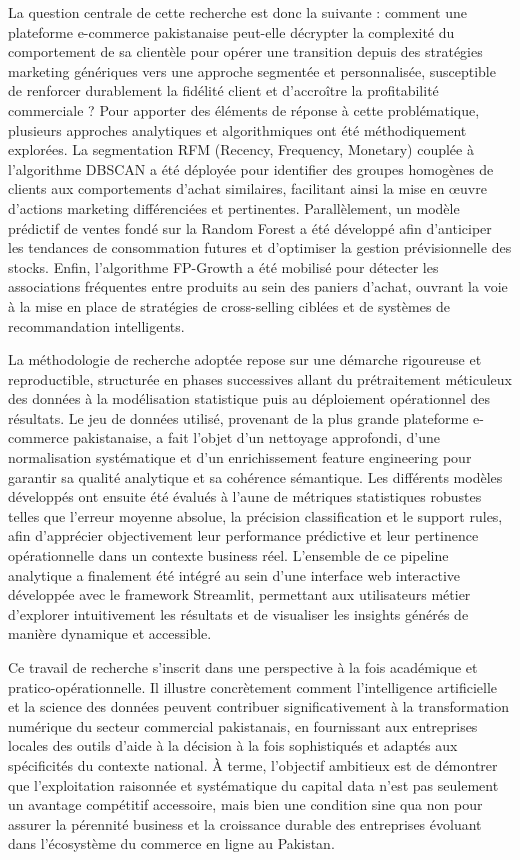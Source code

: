 \documentclass[a4paper,12pt]{article}
\begin{document}
La question centrale de cette recherche est donc la suivante : comment une plateforme e-commerce pakistanaise peut-elle décrypter la complexité du comportement de sa clientèle pour opérer une transition depuis des stratégies marketing génériques vers une approche segmentée et personnalisée, susceptible de renforcer durablement la fidélité client et d'accroître la profitabilité commerciale ? Pour apporter des éléments de réponse à cette problématique, plusieurs approches analytiques et algorithmiques ont été méthodiquement explorées. La segmentation RFM (Recency, Frequency, Monetary) couplée à l'algorithme DBSCAN a été déployée pour identifier des groupes homogènes de clients aux comportements d'achat similaires, facilitant ainsi la mise en œuvre d'actions marketing différenciées et pertinentes. Parallèlement, un modèle prédictif de ventes fondé sur la Random Forest a été développé afin d'anticiper les tendances de consommation futures et d'optimiser la gestion prévisionnelle des stocks. Enfin, l'algorithme FP-Growth a été mobilisé pour détecter les associations fréquentes entre produits au sein des paniers d'achat, ouvrant la voie à la mise en place de stratégies de cross-selling ciblées et de systèmes de recommandation intelligents.

La méthodologie de recherche adoptée repose sur une démarche rigoureuse et reproductible, structurée en phases successives allant du prétraitement méticuleux des données à la modélisation statistique puis au déploiement opérationnel des résultats. Le jeu de données utilisé, provenant de la plus grande plateforme e-commerce pakistanaise, a fait l'objet d'un nettoyage approfondi, d'une normalisation systématique et d'un enrichissement feature engineering pour garantir sa qualité analytique et sa cohérence sémantique. Les différents modèles développés ont ensuite été évalués à l'aune de métriques statistiques robustes telles que l'erreur moyenne absolue, la précision classification et le support rules, afin d'apprécier objectivement leur performance prédictive et leur pertinence opérationnelle dans un contexte business réel. L'ensemble de ce pipeline analytique a finalement été intégré au sein d'une interface web interactive développée avec le framework Streamlit, permettant aux utilisateurs métier d'explorer intuitivement les résultats et de visualiser les insights générés de manière dynamique et accessible.

Ce travail de recherche s'inscrit dans une perspective à la fois académique et pratico-opérationnelle. Il illustre concrètement comment l'intelligence artificielle et la science des données peuvent contribuer significativement à la transformation numérique du secteur commercial pakistanais, en fournissant aux entreprises locales des outils d'aide à la décision à la fois sophistiqués et adaptés aux spécificités du contexte national. À terme, l'objectif ambitieux est de démontrer que l'exploitation raisonnée et systématique du capital data n'est pas seulement un avantage compétitif accessoire, mais bien une condition sine qua non pour assurer la pérennité business et la croissance durable des entreprises évoluant dans l'écosystème du commerce en ligne au Pakistan.
\end{document}
